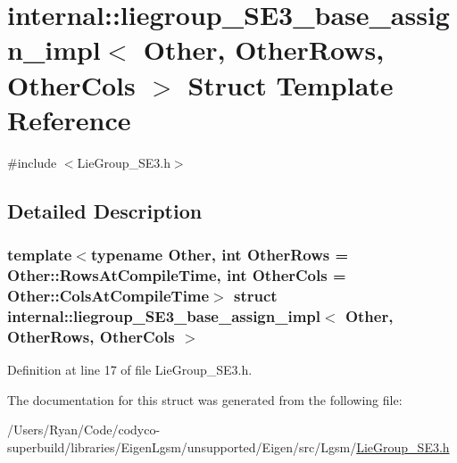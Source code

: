 \hypertarget{structinternal_1_1liegroup___s_e3__base__assign__impl}{}\section{internal\+:\+:liegroup\+\_\+\+S\+E3\+\_\+base\+\_\+assign\+\_\+impl$<$ Other, Other\+Rows, Other\+Cols $>$ Struct Template Reference}
\label{structinternal_1_1liegroup___s_e3__base__assign__impl}


{\ttfamily \#include $<$Lie\+Group\+\_\+\+S\+E3.\+h$>$}



\subsection{Detailed Description}
\subsubsection*{template$<$typename Other, int Other\+Rows = Other\+::\+Rows\+At\+Compile\+Time, int Other\+Cols = Other\+::\+Cols\+At\+Compile\+Time$>$\newline
struct internal\+::liegroup\+\_\+\+S\+E3\+\_\+base\+\_\+assign\+\_\+impl$<$ Other, Other\+Rows, Other\+Cols $>$}



Definition at line 17 of file Lie\+Group\+\_\+\+S\+E3.\+h.



The documentation for this struct was generated from the following file\+:\begin{DoxyCompactItemize}
\item 
/\+Users/\+Ryan/\+Code/codyco-\/superbuild/libraries/\+Eigen\+Lgsm/unsupported/\+Eigen/src/\+Lgsm/\hyperlink{_lie_group___s_e3_8h}{Lie\+Group\+\_\+\+S\+E3.\+h}\end{DoxyCompactItemize}
